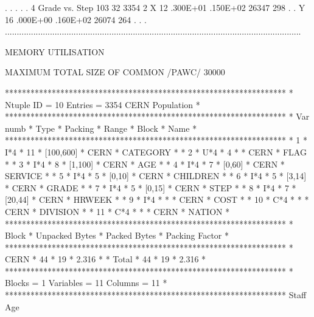 \begin{Listing}
 .                                                                                                                           .
 .                                                                                                                           .
 .   4  Grade vs. Step                               103  32     3354  2  X    12    .300E+01    .150E+02       26347    298 .
 .                                                                        Y    16    .000E+00    .160E+02       26074    264 .
 .                                                                                                                           .
 .............................................................................................................................

 MEMORY UTILISATION

      MAXIMUM TOTAL SIZE OF COMMON /PAWC/            30000

 ******************************************************************
 * Ntuple ID = 10     Entries = 3354      CERN Population         *
 ******************************************************************
 * Var numb * Type * Packing *    Range     *  Block   *  Name    *
 ******************************************************************
 *      1   * I*4  *    11   * [100,600]    * CERN     * CATEGORY *
 *      2   * U*4  *    4    *              * CERN     * FLAG     *
 *      3   * I*4  *    8    * [1,100]      * CERN     * AGE      *
 *      4   * I*4  *    7    * [0,60]       * CERN     * SERVICE  *
 *      5   * I*4  *    5    * [0,10]       * CERN     * CHILDREN *
 *      6   * I*4  *    5    * [3,14]       * CERN     * GRADE    *
 *      7   * I*4  *    5    * [0,15]       * CERN     * STEP     *
 *      8   * I*4  *    7    * [20,44]      * CERN     * HRWEEK   *
 *      9   * I*4  *         *              * CERN     * COST     *
 *     10   * C*4  *         *              * CERN     * DIVISION *
 *     11   * C*4  *         *              * CERN     * NATION   *
 ******************************************************************
 *  Block   * Unpacked Bytes * Packed Bytes *   Packing Factor    *
 ******************************************************************
 * CERN     *    44          *    19        *    2.316            *
 * Total    *    44          *    19        *    2.316            *
 ******************************************************************
 * Blocks = 1            Variables = 11           Columns = 11    *
 ******************************************************************
\newpage
 Staff Age                                                                       
 

\end{Listing}
